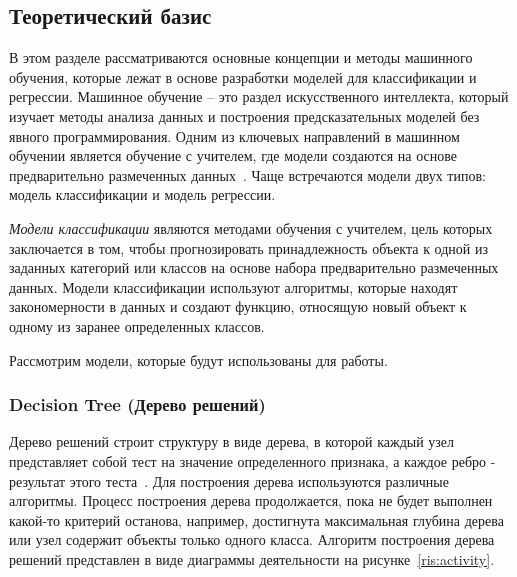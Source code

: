 \subsection{Теоретический базис}
\label{sec:Models}

В этом разделе рассматриваются основные концепции и методы машинного обучения, которые лежат в основе разработки моделей для классификации и регрессии. Машинное обучение -- это раздел искусственного интеллекта, который изучает методы анализа данных и построения предсказательных моделей без явного программирования. Одним из ключевых направлений в машинном обучении является обучение с учителем, где модели создаются на основе предварительно размеченных данных~\cite{books_daglib_0033642}. Чаще встречаются модели двух типов: модель классификации и модель регрессии.

\textit{Модели классификации} являются методами обучения с учителем, цель которых заключается в том, чтобы прогнозировать принадлежность объекта к одной из заданных категорий или классов на основе набора предварительно размеченных данных. Модели классификации используют алгоритмы, которые находят закономерности в данных и создают функцию, относящую новый объект к одному из заранее определенных классов.

Рассмотрим модели, которые будут использованы для работы.
\vspace{1em}

\subsubsection*{Decision Tree (Дерево решений)}
    
Дерево решений строит структуру в виде дерева, в которой каждый узел представляет собой тест на значение определенного признака, а каждое ребро - результат этого теста~\cite{izza2020explaining}. Для построения дерева используются различные алгоритмы. Процесс построения дерева продолжается, пока не будет выполнен какой-то критерий останова, например, достигнута максимальная глубина дерева или узел содержит объекты только одного класса. Алгоритм построения дерева решений представлен в виде диаграммы деятельности на рисунке~\ref{ris:activity}.


